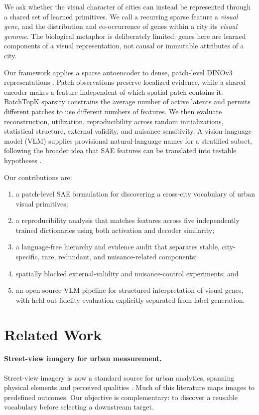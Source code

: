 \documentclass[10pt]{article}
\begin{document}
We ask whether the visual character of cities can instead be represented through a
shared set of learned primitives. We call a recurring sparse feature a \emph{visual
gene}, and the distribution and co-occurrence of genes within a city its \emph{visual
genome}. The biological metaphor is deliberately limited: genes here are learned
components of a visual representation, not causal or immutable attributes of a city.

Our framework applies a sparse autoencoder to dense, patch-level DINOv3
representations \cite{simeoni2025dinov3}. Patch observations preserve localized
evidence, while a shared encoder makes a feature independent of which spatial patch
contains it. BatchTopK sparsity \cite{bussmann2024batchtopk} constrains the average
number of active latents and permits different patches to use different numbers of
features. We then evaluate reconstruction, utilization, reproducibility across
random initializations, statistical structure, external validity, and nuisance
sensitivity. A vision-language model (VLM) supplies provisional natural-language
names for a stratified subset, following the broader idea that SAE features can be
translated into testable hypotheses \cite{movva2025hypothesaes}.

Our contributions are:
\begin{enumerate}[leftmargin=*]
  \item a patch-level SAE formulation for discovering a cross-city vocabulary of
  urban visual primitives;
  \item a reproducibility analysis that matches features across five independently
  trained dictionaries using both activation and decoder similarity;
  \item a language-free hierarchy and evidence audit that separates stable,
  city-specific, rare, redundant, and nuisance-related components;
  \item spatially blocked external-validity and nuisance-control experiments; and
  \item an open-source VLM pipeline for structured interpretation of visual genes,
  with held-out fidelity evaluation explicitly separated from label generation.
\end{enumerate}

\section{Related Work}
\paragraph{Street-view imagery for urban measurement.}
Street-view imagery is now a standard source for urban analytics, spanning physical
elements and perceived qualities \cite{biljecki2021streetview,dubey2016deep}. Much
of this literature maps images to predefined outcomes. Our objective is
complementary: to discover a reusable vocabulary before selecting a downstream
target.
\end{document}
